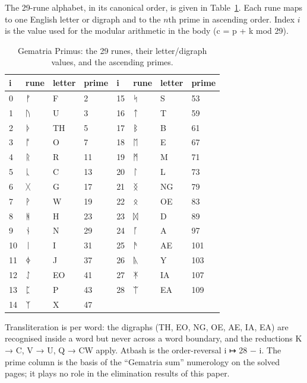 \documentclass[11pt]{article}
\begin{document}
The 29-rune alphabet, in its canonical order, is given in Table~\ref{tab:gp}. Each rune maps to one English letter or digraph and to the $n$th prime in ascending order. Index $i$ is the value used for the modular arithmetic in the body (c = p + k mod 29).

\begin{table}[t]
\centering
\begin{tabular}{llllllll}
\hline
i & rune & letter & prime & i & rune & letter & prime \\ \hline
0 & ᚠ & F & 2 & 15 & ᛋ & S & 53 \\
1 & ᚢ & U & 3 & 16 & ᛏ & T & 59 \\
2 & ᚦ & TH & 5 & 17 & ᛒ & B & 61 \\
3 & ᚩ & O & 7 & 18 & ᛖ & E & 67 \\
4 & ᚱ & R & 11 & 19 & ᛗ & M & 71 \\
5 & ᚳ & C & 13 & 20 & ᛚ & L & 73 \\
6 & ᚷ & G & 17 & 21 & ᛝ & NG & 79 \\
7 & ᚹ & W & 19 & 22 & ᛟ & OE & 83 \\
8 & ᚻ & H & 23 & 23 & ᛞ & D & 89 \\
9 & ᚾ & N & 29 & 24 & ᚪ & A & 97 \\
10 & ᛁ & I & 31 & 25 & ᚫ & AE & 101 \\
11 & ᛄ & J & 37 & 26 & ᚣ & Y & 103 \\
12 & ᛇ & EO & 41 & 27 & ᛡ & IA & 107 \\
13 & ᛈ & P & 43 & 28 & ᛠ & EA & 109 \\
14 & ᛉ & X & 47 &  &  &  &  \\
\hline
\end{tabular}
\caption{Gematria Primus: the 29 runes, their letter/digraph values, and the ascending primes.}
\label{tab:gp}
\end{table}

Transliteration is per word: the digraphs (TH, EO, NG, OE, AE, IA, EA) are recognised inside a word but never across a word boundary, and the reductions K → C, V → U, Q → CW apply. Atbash is the order-reversal i ↦ 28 − i. The prime column is the basis of the ``Gematria sum'' numerology on the solved pages; it plays no role in the elimination results of this paper.
\end{document}
